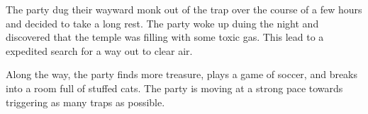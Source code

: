 The party dug their wayward monk out of the trap over the course of a few hours and decided to take a long rest.
The party woke up duing the night and discovered that the temple was filling with some toxic gas.
This lead to a expedited search for a way out to clear air.

Along the way, the party finds more treasure, plays a game of soccer, and breaks into a room full of stuffed cats.
The party is moving at a strong pace towards triggering as many traps as possible.

